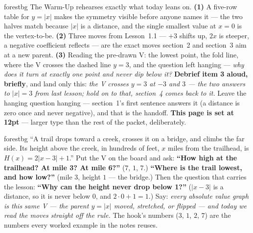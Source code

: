\documentclass[10pt]{article}
\begin{document}
\begin{fixedskillbox}{forestbg}
The Warm-Up rehearses exactly what today leans on. \textbf{(1)} A five-row table for $y=|x|$ makes
the symmetry visible before anyone names it --- the two halves match because $|x|$ is a distance,
and the single smallest value at $x=0$ is the vertex-to-be. \textbf{(2)} Three moves from
Lesson~1.1 --- $+3$ shifts up, $2x$ is steeper, a negative coefficient reflects --- are the exact
moves section~2 and section~3 aim at a new parent. \textbf{(3)} Reading the pre-drawn V: the lowest
point, the fold line, where the V crosses the dashed line $y=3$, and the question left hanging
--- \emph{why does it turn at exactly one point and never dip below it?} \textbf{Debrief item 3
aloud, briefly}, and land only this: \emph{the V crosses $y=3$ at $-3$ and $3$ --- the two answers
to $|x|=3$ from last lesson; hold on to that, section~4 comes back to it.} Leave the hanging
question hanging --- section~1's first sentence answers it (a distance is zero once and never
negative), and that is the handoff. \textbf{This page is set at 12pt} --- larger type than the
rest of the packet, deliberately.
\end{fixedskillbox}

\begin{skillbox}[Hook]{forestbg}
    ``A trail drops toward a creek, crosses it on a bridge, and climbs the far side. Its height
    above the creek, in hundreds of feet, $x$ miles from the trailhead, is $H(x)=2|x-3|+1$.'' Put
    the V on the board and ask: \textbf{``How high at the trailhead? At mile 3? At mile 6?''}
    ($7$, $1$, $7$.) \textbf{``Where is the trail lowest, and how low?''} (mile $3$, height $1$ ---
    the bridge.) Then the question that carries the lesson: \textbf{``Why can the height never
    drop below 1?''} ($|x-3|$ is a distance, so it is never below $0$, and $2\cdot0+1=1$.) Say:
    \emph{every absolute value graph is this same V --- the parent $y=|x|$ moved, stretched, or
    flipped --- and today we read the moves straight off the rule.} The hook's numbers ($3$, $1$,
    $2$, $7$) are the numbers every worked example in the notes reuses.
\end{skillbox}
\end{document}
